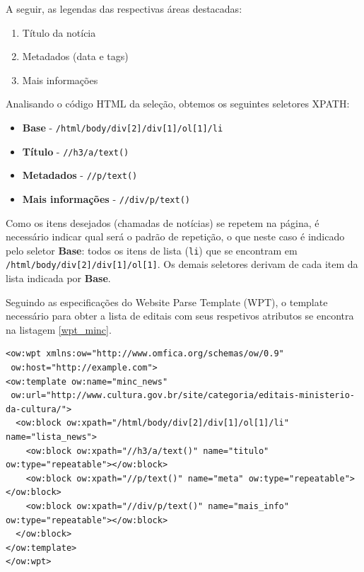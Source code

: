 A seguir, as legendas das respectivas áreas destacadas:

\begin{enumerate}
	\item Título da notícia
	\item Metadados (data e tags)
	\item Mais informações
\end{enumerate}

Analisando o código HTML da seleção, obtemos os seguintes seletores XPATH:

\begin{itemize}
	\item \textbf{Base} - \texttt{/html/body/div[2]/div[1]/ol[1]/li}
	\item \textbf{Título} - \texttt{//h3/a/text()}
	\item \textbf{Metadados} - \texttt{//p/text()}
	\item \textbf{Mais informações} - \texttt{//div/p/text()}
\end{itemize}

Como os itens desejados (chamadas de notícias) se repetem na página, é necessário indicar qual será o padrão de repetição, o que neste caso é indicado pelo seletor \textbf{Base}: todos os itens de lista (\texttt{li}) que se encontram em \texttt{/html/body/div[2]/div[1]/ol[1]}. Os demais seletores derivam de cada item da lista indicada por \textbf{Base}.

Seguindo as especificações do Website Parse Template (WPT), o template necessário para obter a lista de editais com seus respetivos atributos se encontra na listagem \ref{wpt_minc}.

\begin{lstlisting}[label=wpt_minc]
<ow:wpt xmlns:ow="http://www.omfica.org/schemas/ow/0.9"
 ow:host="http://example.com">
<ow:template ow:name="minc_news" 
 ow:url="http://www.cultura.gov.br/site/categoria/editais-ministerio-da-cultura/">
  <ow:block ow:xpath="/html/body/div[2]/div[1]/ol[1]/li" name="lista_news">
    <ow:block ow:xpath="//h3/a/text()" name="titulo" ow:type="repeatable"></ow:block>
    <ow:block ow:xpath="//p/text()" name="meta" ow:type="repeatable"></ow:block>
    <ow:block ow:xpath="//div/p/text()" name="mais_info" ow:type="repeatable"></ow:block>
  </ow:block>
</ow:template> 
</ow:wpt>
\end{lstlisting}


